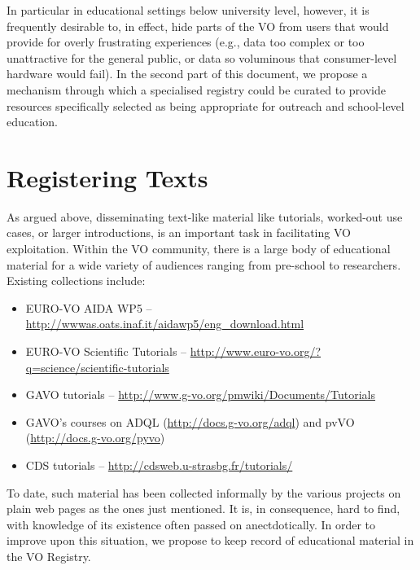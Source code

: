 \documentclass{ivoa}
\begin{document}
In particular in educational settings below university level, however,
it is frequently desirable to, in effect, hide parts of the VO from
users that would provide for overly frustrating experiences (e.g., data
too complex or too unattractive for the general public, or data so
voluminous that consumer-level hardware would fail).  In the second part
of this document, we propose a mechanism through which a specialised
registry could be curated to provide resources specifically selected as
being appropriate for outreach and school-level education.


\section{Registering Texts}

\label{sect:regext}

As argued above, disseminating text-like material
like tutorials, worked-out use cases, or larger introductions,
is an important task in facilitating VO exploitation.  
Within the VO community, there is a large body of
educational material for a wide variety of audiences ranging from pre-school to
researchers.  Existing collections include:

\begin{itemize}

\item EURO-VO AIDA WP5 -- \url{http://wwwas.oats.inaf.it/aidawp5/eng_download.html}

\item EURO-VO Scientific Tutorials -- \url{http://www.euro-vo.org/?q=science/scientific-tutorials}

\item GAVO tutorials --
\url{http://www.g-vo.org/pmwiki/Documents/Tutorials}

\item GAVO's courses on ADQL (\url{http://docs.g-vo.org/adql}) and pvVO
(\url{http://docs.g-vo.org/pyvo})

\item CDS tutorials -- \url{http://cdsweb.u-strasbg.fr/tutorials/}
\end{itemize}


To date, such material has been collected informally by the various
projects on plain web pages as the ones just mentioned.  
It is, in consequence, hard to find, with
knowledge of its existence often passed on anectdotically. In order to improve upon 
this situation, we
propose to keep record of educational material in the VO Registry.
\end{document}
